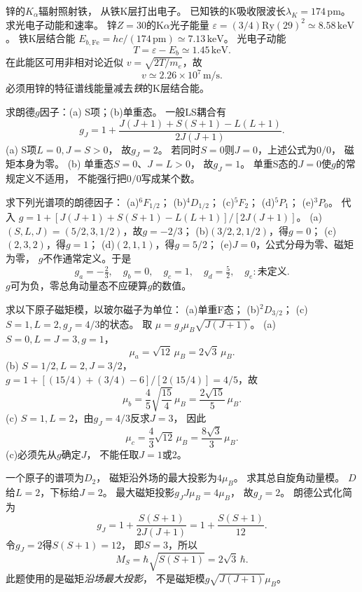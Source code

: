 锌的$K_\alpha$辐射照射铁，
从铁K层打出电子。
已知铁的K吸收限波长$\lambda_K=174\,\mathrm{pm}$。
求光电子动能和速率。
\exsolution
锌$Z=30$的K$\alpha$光子能量
$\varepsilon=(3/4)\mathrm{Ry}(29)^2
\simeq8.58\,\mathrm{keV}$。
铁K层结合能
$E_{b,\mathrm{Fe}}=hc/(174\,\mathrm{pm})
\simeq7.13\,\mathrm{keV}$。
光电子动能
\[
 \boxed{T=\varepsilon-E_b\simeq1.45\,\mathrm{keV}}.
\]
在此能区可用非相对论近似
$v=\sqrt{2T/m_e}$，故
\[
 \boxed{v\simeq2.26\times10^7\,\mathrm{m/s}}.
\]
\excheck 必须用锌的特征谱线能量减去\emph{铁}的K层结合能。

求朗德$g$因子：(a) S项；(b)单重态。
\exsolution
一般LS耦合有
\[
 g_J=1+\frac{J(J+1)+S(S+1)-L(L+1)}
 {2J(J+1)}.
\]
(a) S项$L=0,J=S>0$，
故$\boxed{g_J=2}$。
若同时$S=0$则$J=0$，上述公式为$0/0$，
磁矩本身为零。
(b) 单重态$S=0$、$J=L>0$，
故$\boxed{g_J=1}$。
\excheck 单重S态的$J=0$使$g$的常规定义不适用，
不能强行把$0/0$写成某个数。

求下列光谱项的朗德因子：
(a)\({}^{6}F_{1/2}\)；
(b)\({}^{4}D_{1/2}\)；
(c)\({}^{5}F_2\)；
(d)\({}^{5}P_1\)；
(e)\({}^{3}P_0\)。
\exsolution
代入
$g=1+[J(J+1)+S(S+1)-L(L+1)]/[2J(J+1)]$。
(a)$(S,L,J)=(5/2,3,1/2)$，故$g=-2/3$；
(b)$(3/2,2,1/2)$，得$g=0$；
(c)$(2,3,2)$，得$g=1$；
(d)$(2,1,1)$，得$g=5/2$；
(e)$J=0$，公式分母为零、磁矩为零，
$g$不作通常定义。于是
\[
 \boxed{g_a=-\tfrac23,\quad g_b=0,\quad
 g_c=1,\quad g_d=\tfrac52,\quad g_e:\text{未定义}}.
\]
\excheck $g$可为负，零总角动量态不应硬算$g$的数值。

求以下原子磁矩模，以玻尔磁子为单位：
(a)单重F态；
(b)\({}^{2}D_{3/2}\)；
(c)$S=1,L=2,g_J=4/3$的状态。
\exsolution
取
$\mu=g_J\mu_B\sqrt{J(J+1)}$。
(a) $S=0,L=J=3,g=1$，
\[
 \boxed{\mu_a=\sqrt{12}\,\mu_B=2\sqrt3\,\mu_B}.
\]
(b) $S=1/2,L=2,J=3/2$，
$g=1+[(15/4)+(3/4)-6]/[2(15/4)]=4/5$，故
\[
 \boxed{\mu_b=\frac45\sqrt{\frac{15}4}\,\mu_B
 =\frac{2\sqrt{15}}5\,\mu_B}.
\]
(c) $S=1,L=2$，由$g_J=4/3$反求$J=3$，
因此
\[
 \boxed{\mu_c=\frac43\sqrt{12}\,\mu_B
 =\frac{8\sqrt3}{3}\,\mu_B}.
\]
\excheck (c)必须先从$g$确定$J$，
不能任取$J=1$或2。

一个原子的谱项为$D_2$，
磁矩沿外场的最大投影为$4\mu_B$。
求其总自旋角动量模。
\exsolution
$D$给$L=2$，下标给$J=2$。
最大磁矩投影$g_JJ\mu_B=4\mu_B$，
故$g_J=2$。
朗德公式化简为
\[
 g_J=1+\frac{S(S+1)}{2J(J+1)}
 =1+\frac{S(S+1)}{12}.
\]
令$g_J=2$得$S(S+1)=12$，
即$S=3$，所以
\[
 \boxed{M_S=\hbar\sqrt{S(S+1)}=
 2\sqrt3\,\hbar}.
\]
\excheck 此题使用的是磁矩\emph{沿场最大投影}，
不是磁矩模$g\sqrt{J(J+1)}\mu_B$。

